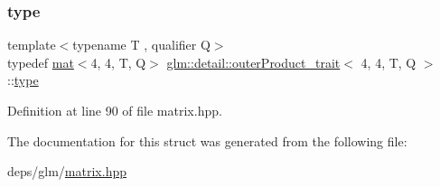 \subsubsection{\texorpdfstring{type}{type}}
{\footnotesize\ttfamily template$<$typename T , qualifier Q$>$ \\
typedef \hyperlink{structglm_1_1mat}{mat}$<$4, 4, T, Q$>$ \hyperlink{structglm_1_1detail_1_1outerProduct__trait}{glm\+::detail\+::outer\+Product\+\_\+trait}$<$ 4, 4, T, Q $>$\+::\hyperlink{structglm_1_1mat_3_014_00_014_00_01T_00_01Q_01_4}{type}}



Definition at line 90 of file matrix.\+hpp.



The documentation for this struct was generated from the following file\+:\begin{DoxyCompactItemize}
\item 
deps/glm/\hyperlink{matrix_8hpp}{matrix.\+hpp}\end{DoxyCompactItemize}
